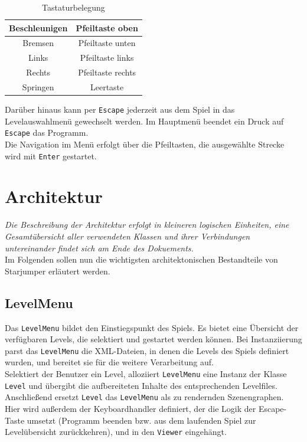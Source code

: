 \documentclass{llncs}
\begin{document}
\begin{table}[H]
	\begin{center}
		\begin{tabular}{|c|c|}
			\hline
			Beschleunigen & Pfeiltaste oben \\
			\hline
			Bremsen & Pfeiltaste unten \\
			\hline
			Links & Pfeiltaste links \\
			\hline
			Rechts & Pfeiltaste rechts \\
			\hline
			Springen & Leertaste \\
			\hline
		\end{tabular}
	\end{center}
	\caption{Tastaturbelegung}
\end{table}
\noindent Dar\"uber hinaus kann per \texttt{Escape} jederzeit aus dem Spiel in das Levelauswahlmen\"u
gewechselt werden. Im Hauptmen\"u beendet ein Druck auf \texttt{Escape} das Programm.\\
Die Navigation im Men\"u erfolgt \"uber die Pfeiltasten, die ausgew\"ahlte Strecke wird mit \texttt{Enter} gestartet.


\section{Architektur}

\textit{Die Beschreibung der Architektur erfolgt in kleineren logischen Einheiten, eine Gesamt\"ubersicht
aller verwendeten Klassen und ihrer Verbindungen untereinander findet sich am Ende des Dokuements.}\\
Im Folgenden sollen nun die wichtigsten architektonischen Bestandteile von Starjumper
erl\"autert werden.

\subsection{LevelMenu}
Das \texttt{LevelMenu} bildet den Einstiegspunkt des Spiels. Es bietet eine \"Ubersicht der verf\"ugbaren
Levels, die selektiert und gestartet werden k\"onnen. Bei Instanziierung parst das \texttt{LevelMenu} die
XML-Dateien, in denen die Levels des Spiels definiert wurden, und bereitet sie f\"ur die weitere Verarbeitung auf.\\
Selektiert der Benutzer ein Level, alloziiert \texttt{LevelMenu} eine Instanz der Klasse \texttt{Level} und
\"ubergibt die aufbereiteten Inhalte des entsprechenden Levelfiles. Anschlie\ss end ersetzt \texttt{Level}
das \texttt{LevelMenu} als zu rendernden Szenengraphen.\\
Hier wird au\ss erdem der Keyboardhandler definiert, der die Logik der Escape-Taste umsetzt (Programm beenden
bzw. aus dem laufenden Spiel zur Level\"ubersicht zur\"uckkehren), und in den \texttt{Viewer} eingeh\"angt.\\
\end{document}
